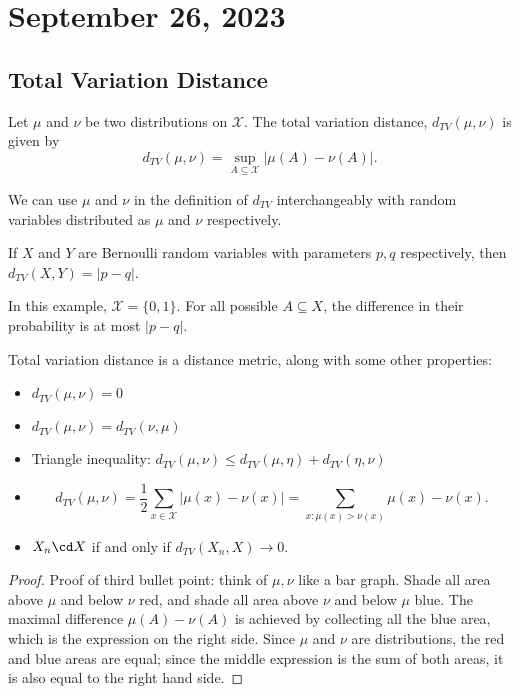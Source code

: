 \section{September 26, 2023}

\subsection{Total Variation Distance}

\begin{definition}

Let $\mu$ and $\nu$ be two distributions on $\mathcal{X}$. The \ac{total variation distance}, $d_{TV}(\mu, \nu)$ is given by 
\[d_{TV}(\mu, \nu) = \sup_{A\subseteq \mathcal{X}}\vert \mu(A) - \nu(A)\vert.\]
\end{definition}

We can use $\mu$ and $\nu$ in the definition of $d_{TV}$ interchangeably with random variables distributed as $\mu$ and $\nu$ respectively. 

\begin{example}
\exlabel

If $X$ and $Y$ are Bernoulli random variables with parameters $p,q$ respectively, then $d_{TV}(X,Y) = \vert p-q\vert$. 
\end{example}

In this example, $\mathcal{X}=\{0,1\}$. For all possible $A\subseteq X$, the difference in their probability is at most $\vert p-q\vert$. 

\begin{theorem}
\proplabel

Total variation distance is a distance metric, along with some other properties:
\begin{itemize}
    \item $d_{TV}(\mu, \nu) = 0$
    \item $d_{TV}(\mu, \nu) = d_{TV}(\nu, \mu)$
    \item Triangle inequality: $d_{TV}(\mu, \nu)\leq d_{TV}(\mu, \eta) + d_{TV}(\eta, \nu)$
    \item 
    \[d_{TV}(\mu, \nu) = \frac{1}{2}\sum_{x\in \mathcal{X}}\vert \mu(x) - \nu(x)\vert = \sum_{x:\mu(x)>\nu(x)}\mu(x)-\nu(x).\]
    \item $X_n\cd X$ if and only if $d_{TV}(X_n, X)\rightarrow 0$. 
\end{itemize}
\end{theorem}

\begin{proof}
Proof of third bullet point: think of $\mu, \nu$ like a bar graph. Shade all area above $\mu$ and below $\nu$ red, and shade all area above $\nu$ and below $\mu$ blue. The maximal difference $\mu(A)-\nu(A)$ is achieved by collecting all the blue area, which is the expression on the right side. Since $\mu$ and $\nu$ are distributions, the red and blue areas are equal; since the middle expression is the sum of both areas, it is also equal to the right hand side. 
\end{proof}

